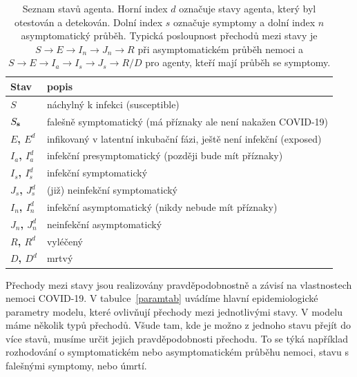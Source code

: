 \begin{table}
\centering
  \begin{tabular}{lp{}}
    \hline
		Stav & popis \\\hline
    {\bf $S$} & náchylný k infekci (susceptible)\\
    {\bf $S_{\bf s}$} & falešně symptomatický (má příznaky ale není nakažen COVID-19)\\ 
    {\bf $E$, $E^d$} & infikovaný v latentní inkubační fázi, ještě není infekční (exposed) \\
    {\bf $I_{a}$, $I^d_{a}$} & infekční presymptomatický (později bude mít příznaky) \\
    {\bf $I_{s}$, $I^d_{s}$} & infekční symptomatický \\ 
    {\bf $J_{s}$, $J^d_{s}$} & (již) neinfekční symptomatický \\ 
    {\bf $I_{n}$, $I^d_{n}$} & infekční asymptomatický (nikdy nebude mít příznaky) \\ 
    {\bf $J_{ n}$, $J^d_{n}$} & neinfekční asymptomatický \\ 
    {\bf $R$, $R^{d}$} & vyléčený \\
    {\bf $D$, $D^{d}$} & mrtvý  \\
    \hline
  \end{tabular}
  \caption{Seznam stavů agenta. Horní index $d$ označuje stavy agenta, který byl otestován a detekován. Dolní index $s$ označuje symptomy a dolní index $n$ asymptomatický průběh. Typická posloupnost přechodů mezi stavy je $ S \rightarrow  E \rightarrow I_n \rightarrow J_n \rightarrow R$ při asymptomatickém průběh nemoci a $S \rightarrow E \rightarrow I_a \rightarrow I_s \rightarrow J_s \rightarrow R/D$ pro agenty, kteří mají průběh se symptomy.}
  \label{tab:states}
\end{table} 

Přechody mezi stavy jsou realizovány pravděpodobnostně a závisí na vlastnostech nemoci COVID-19. V tabulce~\ref{paramtab} uvádíme hlavní epidemiologické parametry modelu, které ovlivňují přechody mezi jednotlivými stavy. V modelu máme několik typů přechodů. Všude tam, kde je možno z jednoho stavu přejít do více stavů, musíme určit jejich pravděpodobnosti přechodu. To se týká například rozhodování o symptomatickém nebo asymptomatickém průběhu nemoci, stavu s falešnými symptomy, nebo úmrtí. 

